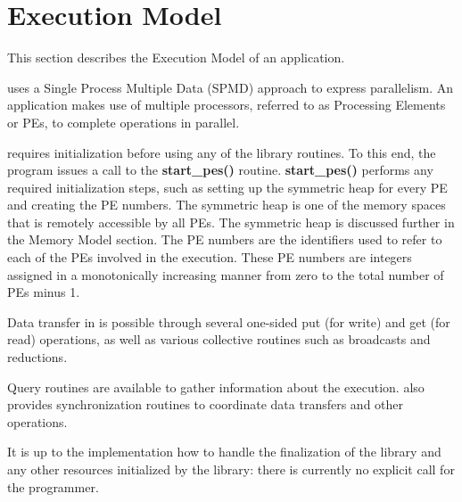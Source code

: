 
\section{Execution Model}

This section describes the Execution Model of an \openshmem application.

\openshmem uses a Single Process Multiple Data (SPMD) approach to express
parallelism. An \openshmem application makes use of multiple processors,
referred to as Processing Elements or PEs, to complete operations
in parallel.


\openshmem requires initialization before using any of the library
routines. To this end, the program issues a call to the \textbf{start\_pes()}
routine. \textbf{start\_pes()} performs any required initialization
steps, such as setting up the symmetric heap for every PE and creating
the PE numbers. The symmetric heap is one of the memory spaces
that is remotely accessible by all PEs. The symmetric heap is discussed
further in the Memory Model section. The PE numbers are the
identifiers used to refer to each of the PEs involved in the execution.
These PE numbers are integers assigned in a monotonically
increasing manner from zero to the total number of PEs minus 1.

Data transfer in \openshmem is possible through several one-sided put
(for write) and get (for read) operations, as well as various collective
routines such as broadcasts and reductions.

Query routines are available to gather information about the execution.
\openshmem also provides synchronization routines to coordinate data
transfers and other operations. 

It is up to the implementation how to handle the finalization of the
\openshmem library and any other resources initialized by the library:
there is currently no explicit call for the programmer.



